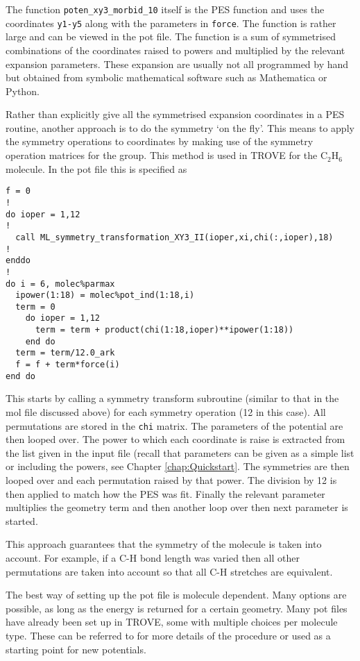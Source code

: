 The function \verb|poten_xy3_morbid_10| itself is the PES function and uses the coordinates \verb|y1-y5| along 
with the parameters in \verb|force|. The function is rather large and can be viewed in the pot file. 
The function is a sum of symmetrised combinations of the coordinates raised to powers
and multiplied by the relevant expansion parameters. These expansion are usually not all programmed by hand but 
obtained from symbolic mathematical software such as Mathematica or Python.

Rather than explicitly give all the symmetrised expansion coordinates in a PES routine, another approach is to 
do the symmetry `on the fly'. This means to apply the symmetry operations to coordinates by making use of the 
symmetry operation matrices for the group. This method is used in TROVE for the C$_2$H$_6$ molecule. In the pot file this
is specified as
\begin{verbatim}
f = 0
!
do ioper = 1,12
!
  call ML_symmetry_transformation_XY3_II(ioper,xi,chi(:,ioper),18)
!
enddo
!
do i = 6, molec%parmax
  ipower(1:18) = molec%pot_ind(1:18,i)
  term = 0
    do ioper = 1,12
      term = term + product(chi(1:18,ioper)**ipower(1:18))
    end do
  term = term/12.0_ark
  f = f + term*force(i)
end do
\end{verbatim}
This starts by calling a symmetry transform subroutine (similar to that in the mol file discussed above) for each 
symmetry operation (12 in this case). All permutations are stored in the \verb|chi| matrix.  The parameters 
of the potential are then looped over. The power to which each coordinate is raise is extracted from the 
list given in the input file (recall that
parameters can be given as a simple list or including the powers, see Chapter \ref{chap:Quickstart}. The symmetries 
are then looped over and each permutation raised by that power. The division by 12 is then applied to match how the 
PES was fit. Finally the relevant parameter multiplies the geometry term and then another loop over then next parameter
is started.

This approach guarantees that the symmetry of the molecule is taken into account. For example, if a C-H bond length was varied
then all other permutations are taken into account so that all C-H stretches are equivalent. 


The best way of setting up the pot file is molecule dependent. Many options are possible, as long as the energy is returned 
for a certain geometry. Many pot files have already been set up in TROVE, some with multiple choices per molecule type. These
can be referred to for more details of the procedure or used as a starting point for new potentials.








